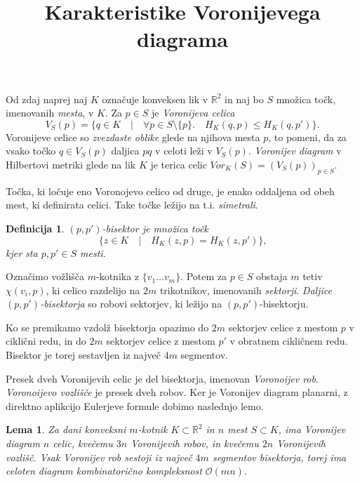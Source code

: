 \documentclass{article}
\title{Karakteristike Voronijevega diagrama}
\newtheorem{lema}{Lema}
\newtheorem{definicija}{Definicija}
\begin{document}
Od zdaj naprej naj $K$ označuje konveksen lik v $\mathbb{R}^2$ in naj bo $S$ množica točk, imenovanih \textit{mesta}, v $K$.
Za $p \in S$ je \textit{Voronijeva celica} $$V_S (p) = \{ q \in K \quad | \quad \forall p \in S \setminus \{ p \}. \quad H_K (q, p) \leq H_K (q, p') \} \text{.}$$
Voronijeve celice so \textit{zvezdaste oblike} glede na njihova mesta $p$, to pomeni, da za vsako točko $q \in V_S(p)$ daljica $pq$ v celoti leži v $V_S(p)$. 
\textit{Voronijev diagram} v Hilbertovi metriki glede na lik $K$ je terica celic $Vor_K (S) = (V_S (p))_{p \in S} \text{.}$

Točka, ki ločuje eno Voronojevo celico od druge, je enako oddaljena od obeh mest, ki definirata celici. Take točke ležijo na t.i. \textit{simetrali}.
\begin{definicija}
    \textit{$(p, p')$-bisektor} je množica točk $$\{ z \in K \quad | \quad H_K (z,p) = H_K (z,p') \} \text{,}$$ kjer sta $p, p' \in S$ mesti.
\end{definicija}

Označimo vožlišča $m$-kotnika z $\{ v_1 \dots v_m \}$. Potem za $p \in S$ obstaja $m$ tetiv $\chi (v_i, p)$, ki celico razdelijo na $2m$ trikotnikov, imenovanih \textit{sektorji}.
\textit{Daljice $(p, p')$-bisektorja} so robovi sektorjev, ki ležijo na $(p, p')$-bisektorju.

Ko se premikamo vzdolž bisektorja opazimo do $2m$ sektorjev celice z mestom $p$ v ciklični redu, in do $2m$ sektorjev celice z mestom $p'$ v obratnem cikličnem redu. Bisektor je torej sestavljen iz največ $4m$ segmentov.


Presek dveh Voronijevih celic je del bisektorja, imenovan \textit{Voronoijev rob}. \textit{Voronoijevo vozlišče} je presek dveh robov.
Ker je Voronijev diagram planarni, z direktno aplikcijo Eulerjeve formule dobimo naslednjo lemo.

\begin{lema}
    Za dani konveksni $m$-kotnik $K \subset \mathbb{R}^2$ in $n$ mest $S \subset K$, ima Voronijev diagram $n$ celic, kvečemu $3n$ Voronijevih robov, in kvečemu $2n$ Voronijevih vozlišč.
    Vsak Voronijev rob sestoji iz največ $4m$ segmentov bisektorja, torej ima celoten diagram kombinatorično kompleksnost $\mathcal{O} (mn)$.
\end{lema}
\end{document}
